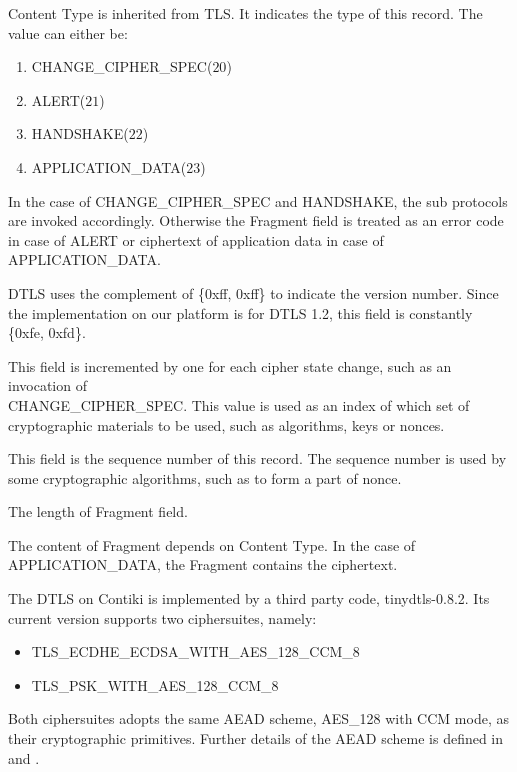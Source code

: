 \begin{description}[style=nextline]
	\item[\textbf{Content Type}]
	Content Type is inherited from TLS. It indicates the type of this record. The value can either be:
	\begin{enumerate}
		\item CHANGE\_CIPHER\_SPEC($20$)
		\item ALERT($21$)
		\item HANDSHAKE($22$)
		\item APPLICATION\_DATA($23$)
	\end{enumerate}
	In the case of CHANGE\_CIPHER\_SPEC and HANDSHAKE, the sub protocols are invoked accordingly. Otherwise the Fragment field is treated as an error code in case of ALERT or ciphertext of application data in case of APPLICATION\_DATA.
	\item[\textbf{Protocol Version}]
	DTLS uses the complement of \{0xff, 0xff\} to indicate the version number. Since the implementation on our platform is for DTLS 1.2, this field is constantly \{0xfe, 0xfd\}.
	\item[\textbf{Epoch}]
	This field is incremented by one for each cipher state change, such as an invocation of \\
	CHANGE\_CIPHER\_SPEC. This value is used as an index of which set of cryptographic materials to be used, such as algorithms, keys or nonces.
	\item[\textbf{Sequence Number}]
	This field is the sequence number of this record. The sequence number is used by some cryptographic algorithms, such as to form a part of nonce.
	\item[\textbf{Length}]
	The length of Fragment field.
	\item[\textbf{Fragment}]
	The content of Fragment depends on Content Type. In the case of APPLICATION\_DATA, the Fragment contains the ciphertext.
\end{description}

The DTLS on Contiki is implemented by a third party code, tinydtls-0.8.2\cite{tinydtls}. Its current version supports two ciphersuites, namely:
\begin{itemize}
	\item TLS\_ECDHE\_ECDSA\_WITH\_AES\_128\_CCM\_8\cite{rfc7251}
	\item TLS\_PSK\_WITH\_AES\_128\_CCM\_8\cite{rfc6655}
\end{itemize}
Both ciphersuites adopts the same AEAD scheme, AES\_128 with CCM mode, as their cryptographic primitives. Further details of the AEAD scheme is defined in \cite{rfc5116} and \cite{CCM}.

